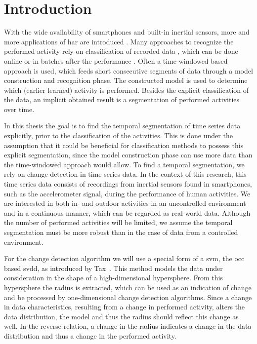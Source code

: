 \chapter{Introduction}

\label{Chapter1} %


With the wide availability of smartphones and built-in inertial sensors, more and more applications of \gls{har} are introduced \cite{avci2010activity,derawi2010accelerometer,guenterberg2009distributed}.
Many approaches to recognize the performed activity rely on classification of recorded data \cite{devaul2001real,ward2006activity,yang2008using,anguita2012human,bao2004activity,bernecker2012activity,he2008activity}, which can be done online or in batches after the performance \cite{duque2012offline}.
Often a time-windowed based approach is used, which feeds short consecutive segments of data through a model construction and recognition phase.
The constructed model is used to determine which (earlier learned) activity is performed.
Besides the explicit classification of the data, an implicit obtained result is a segmentation of performed activities over time.

In this thesis the goal is to find the temporal segmentation of time series data explicitly, prior to the classification of the activities.
This is done under the assumption that it could be beneficial for classification methods to possess this explicit segmentation, since the model construction phase can use more data than the time-windowed approach would allow.
To find a temporal segmentation, we rely on change detection in time series data.
In the context of this research, this time series data consists of recordings from inertial sensors found in smartphones, such as the accelerometer signal, during the performance of human activities.
We are interested in both in- and outdoor activities in an uncontrolled environment and in a continuous manner, which can be regarded as real-world data.
Although the number of performed activities will be limited, we assume the temporal segmentation must be more robust than in the case of data from a controlled environment.

For the change detection algorithm we will use a special form of a \gls{svm}, the \gls{occ} based \gls{svdd}, as introduced by Tax~\cite{tax2001one}.
This method models the data under consideration in the shape of a high-dimensional hypersphere.
From this hypersphere the radius is extracted, which can be used as an indication of change and be processed by one-dimensional change detection algorithms.
Since a change in data characteristics, resulting from a change in performed activity, alters the data distribution, the model and thus the radius should reflect this change as well.
In the reverse relation, a change in the radius indicates a change in the data distribution and thus a change in the performed activity.

